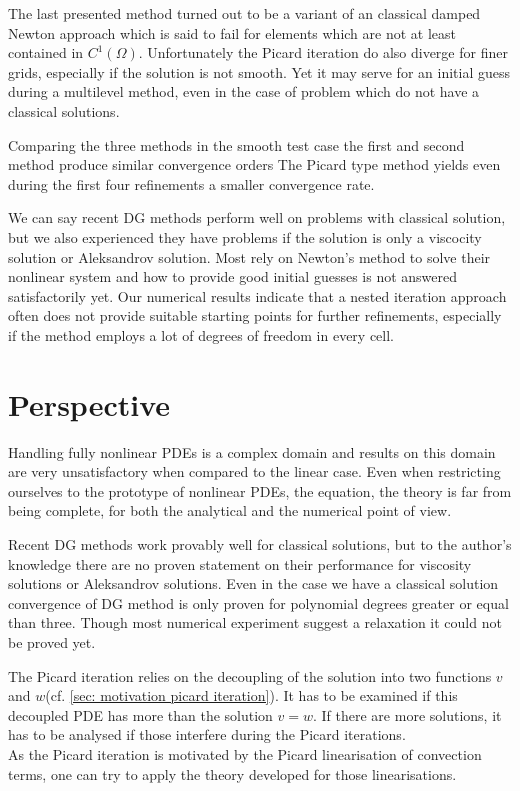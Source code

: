The last presented method turned out to be a variant of an classical damped Newton approach which is said to fail for elements which are not at least contained in $C^1(\Omega)$.
Unfortunately the Picard iteration do also diverge for finer grids, especially if the solution is not smooth. Yet it may serve for an initial guess during a multilevel method, even in the case of problem which do not have a classical solutions.

Comparing the three methods in the smooth test case the first and second method produce similar convergence orders %
The Picard type method yields even during the first four refinements a smaller convergence rate. 

We can say recent DG methods perform well on problems with classical solution, but we also experienced they have problems if the \MA solution is only a viscocity solution or Aleksandrov solution. Most rely on Newton's method to solve their nonlinear system and how to provide good initial guesses is not answered satisfactorily yet.
Our numerical results indicate that a nested iteration approach often does not provide suitable starting points for further refinements, especially if the method employs a lot of degrees of freedom in every cell.

\section{Perspective}
Handling fully nonlinear PDEs is a complex domain and results on this domain are very unsatisfactory when compared to the linear case. Even when restricting ourselves to the prototype of nonlinear PDEs, the \MA equation, the theory is far from being complete, for both the analytical and the numerical point of view.

Recent DG methods work provably well for classical solutions, but to the author's knowledge there are no proven statement on their performance for viscosity solutions or Aleksandrov solutions. Even in the case we have a classical solution convergence of DG method is only proven for polynomial degrees greater or equal than three. Though most numerical experiment suggest a relaxation it could not be proved yet.

The Picard iteration relies on the decoupling of the solution into two functions $v$ and $w$(cf. \ref{sec: motivation picard iteration}). It has to be examined if this decoupled PDE has more than the solution $v=w$. If there are more solutions, it has to be analysed if those interfere during the Picard iterations. \\
As the Picard iteration is motivated by the Picard linearisation of convection terms, one can try to apply the theory developed for those linearisations.

